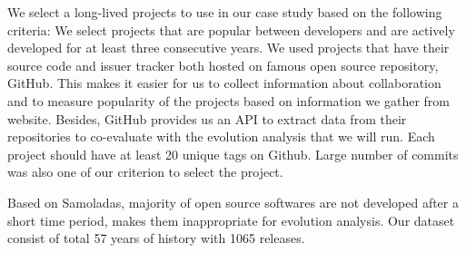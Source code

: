 We select a long-lived projects to use in our case study based on the following criteria:
We select projects that are popular between developers and are actively developed for at least three consecutive years.
	We used projects that have their source code and issuer tracker both hosted on famous open source repository, GitHub. This makes it easier for us to collect information about collaboration and to measure popularity of the projects based on information we gather from website. Besides, GitHub provides us an API to extract data from their repositories to co-evaluate with the evolution analysis that we will run. 
	Each project should have at least 20 unique tags on Github.
	Large number of commits was also one of our criterion to select the project.

Based on Samoladas\cite{Samoladas2010SAD}, majority of open source softwares are not developed after a short time period, makes them inappropriate for evolution analysis. Our dataset consist of total 
57 years of history with 1065 releases. 

